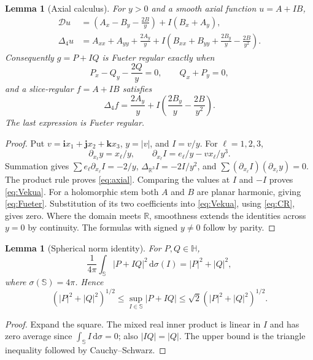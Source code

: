 \documentclass[11pt,a4paper]{article}
\numberwithin{equation}{section}
\newtheorem{lemma}[theorem]{Lemma}
\theoremstyle{definition}
\theoremstyle{remark}
\newcommand{\R}{\mathbb R}
\newcommand{\HH}{\mathbb H}
\newcommand{\SSS}{\mathbb S}
\newcommand{\D}{\mathcal D}
\newcommand{\lap}{\Delta_4}
\newcommand{\dd}{\,\mathrm d}
\newcommand{\ii}{\mathbf i}
\newcommand{\jj}{\mathbf j}
\newcommand{\kk}{\mathbf k}
\begin{document}
\begin{lemma}[Axial calculus]
\label{lem:axial}
For $y>0$ and a smooth axial function $u=A+I B$,
\begin{align}
 \D u&=\left(A_x-B_y-\frac{2B}{y}\right)+I(B_x+A_y),\\
 \lap u&=A_{xx}+A_{yy}+\frac{2A_y}{y}
 +I\left(B_{xx}+B_{yy}+\frac{2B_y}{y}-\frac{2B}{y^2}\right).
 \label{eq:axial}
\end{align}
Consequently $g=P+I Q$ is Fueter regular exactly when
\begin{equation}
 P_x-Q_y-\frac{2Q}{y}=0,\qquad Q_x+P_y=0,
 \label{eq:Vekua}
\end{equation}
and a slice-regular $f=A+IB$ satisfies
\begin{equation}
 \lap f=\frac{2A_y}{y}
 +I\left(\frac{2B_y}{y}-\frac{2B}{y^2}\right).
 \label{eq:Fueter}
\end{equation}
The last expression is Fueter regular.
\end{lemma}
\begin{proof}
Put $v=\ii x_1+\jj x_2+\kk x_3$, $y=|v|$, and $I=v/y$.
For $\ell=1,2,3$,
\[
 \partial_{x_\ell}y=x_\ell/y,\qquad
 \partial_{x_\ell}I=e_\ell/y-vx_\ell/y^3.
\]
Summation gives $\sum e_\ell\partial_{x_\ell}I=-2/y$,
$\Delta_{\R^3}I=-2I/y^2$, and
$\sum(\partial_{x_\ell}I)(\partial_{x_\ell}y)=0$.
The product rule proves \eqref{eq:axial}. Comparing the values at $I$ and
$-I$ proves \eqref{eq:Vekua}. For a holomorphic stem both $A$ and $B$
are planar harmonic, giving \eqref{eq:Fueter}. Substitution of its two
coefficients into \eqref{eq:Vekua}, using \eqref{eq:CR}, gives zero.
Where the domain meets $\R$, smoothness extends the identities across
$y=0$ by continuity. The formulas with signed $y\ne0$ follow by parity.
\end{proof}

\begin{lemma}[Spherical norm identity]
\label{lem:norm}
For $P,Q\in\HH$,
\begin{equation}
 \frac1{4\pi}\int_{\SSS}|P+IQ|^2\dd\sigma(I)=|P|^2+|Q|^2,
 \label{eq:meansquare}
\end{equation}
where $\sigma(\SSS)=4\pi$. Hence
\[
 (|P|^2+|Q|^2)^{1/2}
 \leq\sup_{I\in\SSS}|P+IQ|
 \leq\sqrt2(|P|^2+|Q|^2)^{1/2}.
\]
\end{lemma}
\begin{proof}
Expand the square. The mixed real inner product is linear in $I$ and has
zero average since $\int_{\SSS}I\dd\sigma=0$; also $|IQ|=|Q|$.
The upper bound is the triangle inequality followed by Cauchy--Schwarz.
\end{proof}
\end{document}
